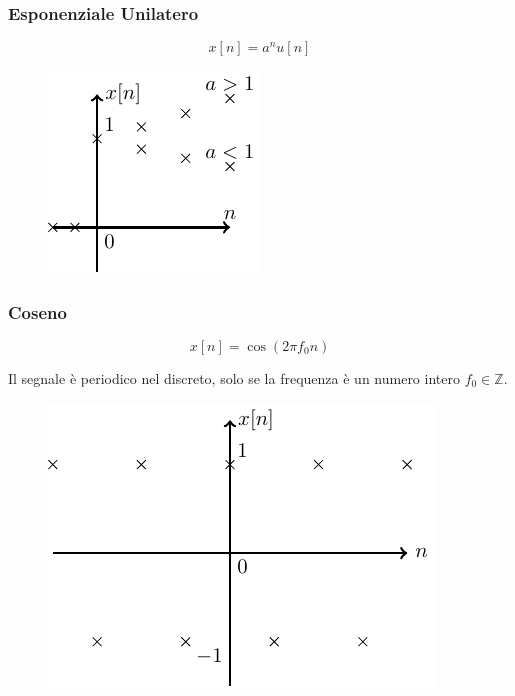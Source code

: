 \documentclass{article}
\numberwithin{equation}{subsection}
\begin{document}
\subsubsection{Esponenziale Unilatero}

\begin{equation}
    x[n]=a^nu[n]
\end{equation}

\begin{figure}[H]%
    \centering
    \includegraphics{esponenziale-unilatero-discreto.pdf}%
\end{figure}

\subsubsection{Coseno}

\begin{equation}
    x[n]=\cos(2\pi f_0n)
\end{equation}

Il segnale è periodico nel discreto, solo se la frequenza è un numero intero $f_0\in\mathbb{Z}$. 

\begin{figure}[H]%
    \centering
    \includegraphics{coseno-discreto.pdf}%
\end{figure}
\end{document}
